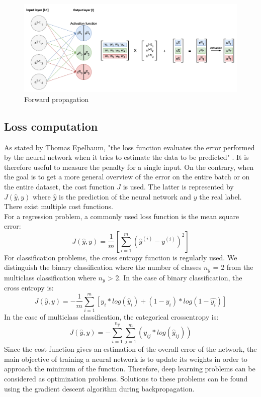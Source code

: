 \begin{figure}[!h]
\centering
\includegraphics[width=1\textwidth, keepaspectratio=true]{./figures/forward_propagation.png}
\caption{Forward propagation }
\label{forward_propagation}
\end{figure}

\subsection{Loss computation}

\setlength{\marginparwidth}{3cm}\leavevmode {}As stated by Thomas Epelbaum, "the loss function evaluates the error performed by the neural network when it tries to estimate the data to be predicted" \cite{18}. It is therefore useful to measure the penalty for a single input. On the contrary, when the goal is to get a more general overview of the error on the entire batch or on the entire dataset, the cost function $J$ is used. The latter is represented by $J(\hat{y}, y)$ where $\hat{y}$ is the prediction of the neural network and $y$ the real label. There exist multiple cost functions.\\
For a regression problem, a commonly used loss function is the mean square error:
\begin{equation}
J(\hat{y}, y) = \frac{1}{m}[\sum_{i=1}^{m} (\hat{y}^{(i)} - y^{(i)})^{2}]
\end{equation}
For classification problems, the cross entropy function is regularly used. We distinguish the binary classification where the number of classes $n_{y}$ = 2 from the multiclass classification where $n_{y}$ > 2. In the case of binary classification, the cross entropy is:
\begin{equation}
J(\hat{y}, y) = -\frac{1}{m}\sum_{i=1}^{m} [y_{i}*log(\hat{y}_{i}) + (1-y_{i})*log(1-\hat{y_i})]
\end{equation}
In the case of multiclass classification, the categorical crossentropy is:
\begin{equation}
J(\hat{y}, y) = - \sum_{i=1}^{n_{y}} \sum_{j=1}^{m} (y_{ij}*log(\hat{y}_{ij}))
\end{equation}
Since the cost function gives an estimation of the overall error of the network, the main objective of training a neural network is to update its weights in order to approach the minimum of the function. Therefore, deep learning problems can be considered as optimization problems. Solutions to these problems can be found using the gradient descent algorithm during backpropagation.

